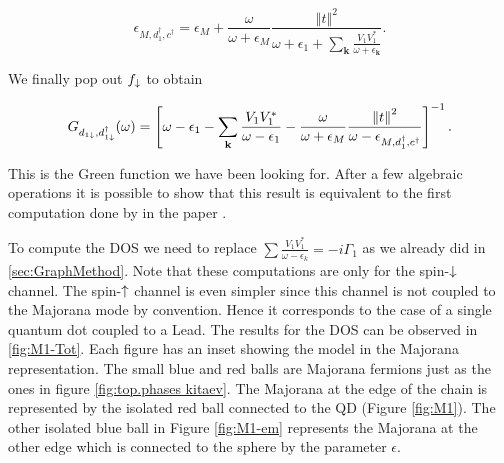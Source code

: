  \begin{equation}
    \epsilon_{M,d_1^\dagger,c^\dagger}= \epsilon_{M}+\frac{\omega}{\omega+\epsilon_{M}}\frac{\left\Vert t\right\Vert ^{2}}{\omega+\epsilon_{1}+\sum_{\mathbf{k}}\frac{V_{1}V_{1}^{*}}{\omega+\epsilon_{\mathbf{k}}}}.
\end{equation}
 
 We finally pop out $f_\downarrow$ to obtain 
 
\begin{equation}
    G_{d_{1\downarrow},d_{1\downarrow}^{\dagger}}(\omega)=\left[\omega-\epsilon_{1}-\sum_{\mathbf{k}}\frac{V_{1}V_{1}^{*}}{\omega-\epsilon_{1}}-\frac{\omega}{\omega+\epsilon_{M}}\frac{\left\Vert t\right\Vert ^{2}}{\omega -\epsilon_{M,d_1^\dagger,c^\dagger}}\right]^{-1}.
\end{equation}

This is the Green function we have been looking for. After a few algebraic operations it is possible to show that this result is equivalent to the first computation done by \citeauthor{liu_detecting_2011}  in the paper \cite{liu_detecting_2011}. 




To compute the DOS we need to replace $\sum \frac{V_1V^*_1}{\omega -\epsilon_k}= -i\Gamma_1$ as we already did in \ref{sec:GraphMethod}. Note that these computations are only for the spin-$\downarrow$ channel. The spin-$\uparrow$ channel is even simpler since this channel is not coupled to the Majorana mode by convention. Hence it corresponds to the case of a single quantum dot coupled to a Lead.  The results for the DOS can be observed in \ref{fig:M1-Tot}. Each figure has an inset showing the model in the Majorana representation. The small blue and red balls are Majorana fermions just as the ones in figure \ref{fig:top.phases kitaev}. The Majorana at the edge of the  chain is represented by the isolated red ball connected to the QD (Figure \ref{fig:M1}). The other isolated blue ball in Figure \ref{fig:M1-em} represents the Majorana at the other edge which is connected to the sphere by the parameter $\epsilon$. 




